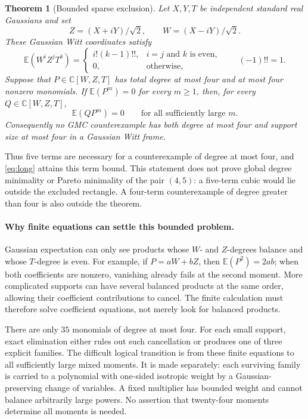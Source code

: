 \documentclass[11pt]{article}
\newtheorem{theorem}{Theorem}[section]
\newcommand{\C}{\mathbb C}
\newcommand{\E}{\mathbb E}
\begin{document}
\begin{samepage}
\begin{theorem}[Bounded sparse exclusion]\label{thm:sparse}
Let \(X,Y,T\) be independent standard real Gaussians and set
\[
 Z=(X+iY)/\sqrt2,\qquad W=(X-iY)/\sqrt2.
\]
These Gaussian Witt coordinates satisfy
\[
 \E(W^iZ^jT^k)=
 \begin{cases}
   i!(k-1)!!,&i=j\text{ and }k\text{ is even},\\
   0,&\text{otherwise},
 \end{cases}
\qquad (-1)!!=1.
\]
Suppose that \(P\in\C[W,Z,T]\) has total degree at most four and at most four
nonzero monomials.  If \(\E(P^m)=0\) for every \(m\geq1\), then, for every
\(Q\in\C[W,Z,T]\),
\[
 \E(QP^m)=0
 \qquad\text{for all sufficiently large }m.
\]
Consequently no GMC counterexample has both degree at most four and support
size at most four in a Gaussian Witt frame.
\end{theorem}
\end{samepage}

Thus five terms are necessary for a counterexample of degree at most
four, and \eqref{eq:long} attains this term bound.  This statement does not
prove global degree minimality or Pareto minimality of the pair \((4,5)\):
a five-term cubic would lie outside the excluded rectangle.  A four-term
counterexample of degree greater than four is also outside the theorem.

\paragraph{Why finite equations can settle this bounded problem.}
Gaussian expectation can only see products whose \(W\)- and \(Z\)-degrees
balance and whose \(T\)-degree is even.  For example, if
\(P=aW+bZ\), then \(\E(P^2)=2ab\); when both coefficients are nonzero,
vanishing already fails at the second moment.  More complicated supports
can have several balanced products at the same order, allowing their
coefficient contributions to cancel.  The finite calculation must
therefore solve coefficient equations, not merely look for balanced
products.

There are only \(35\) monomials of degree at most four.  For each small
support, exact elimination either rules out such cancellation or produces
one of three explicit families.  The difficult logical transition is from
these finite equations to all sufficiently large mixed moments.  It is
made separately: each surviving family is carried to a polynomial with
one-sided isotropic weight by a Gaussian-preserving change of variables.
A fixed multiplier has bounded weight and cannot balance arbitrarily
large powers.  No assertion that twenty-four moments determine all
moments is needed.
\end{document}
